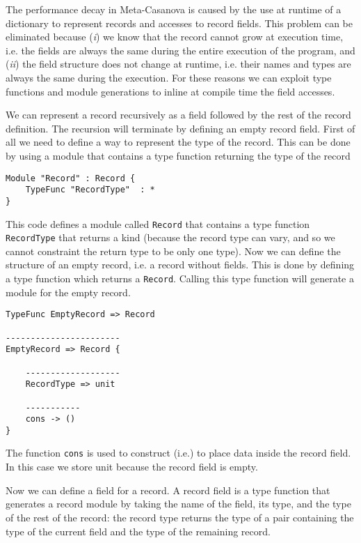 The performance decay in Meta-Casanova is caused by the use at runtime of a dictionary to represent records and accesses to record fields. This problem can be eliminated because (\textit{i}) we know that the record cannot grow at execution time, i.e. the fields are always the same during the entire execution of the program, and (\textit{ii}) the field structure does not change at runtime, i.e. their names and types are always the same during the execution. For these reasons we can exploit type functions and module generations to inline at compile time the field accesses.

We can represent a record recursively as a field followed by the rest of the record definition. The recursion will terminate by defining an empty record field. First of all we need to define a way to represent the type of the record. This can be done by using a module that contains a type function returning the type of the record

\begin{lstlisting}
Module "Record" : Record {
	TypeFunc "RecordType"  : * 
}
\end{lstlisting}

This code defines a module called \texttt{Record} that contains a type function \texttt{RecordType} that returns a kind (because the record type can vary, and so we cannot constraint the return type to be only one type). Now we can define the structure of an empty record, i.e. a record without fields. This is done by defining a type function which returns a \texttt{Record}. Calling this type function will generate a module for the empty record.

\begin{lstlisting}
TypeFunc EmptyRecord => Record

-----------------------
EmptyRecord => Record {

	-------------------
	RecordType => unit
	
	-----------
	cons -> ()
}
\end{lstlisting}

The function \texttt{cons} is used to construct (i.e.) to place data inside the record field. In this case we store unit because the record field is empty.

Now we can define a field for a record. A record field is a type function that generates a record module by taking the name of the field, its type, and the type of the rest of the record: the record type returns the type of a pair containing the type of the current field and the type of the remaining record.

